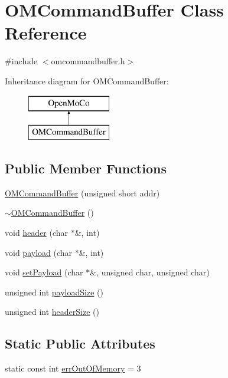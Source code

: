 \hypertarget{class_o_m_command_buffer}{
\section{OMCommandBuffer Class Reference}
\label{class_o_m_command_buffer}
}


{\ttfamily \#include $<$omcommandbuffer.h$>$}

Inheritance diagram for OMCommandBuffer:\begin{figure}[H]
\begin{center}
\leavevmode
\includegraphics[height=2.000000cm]{class_o_m_command_buffer}
\end{center}
\end{figure}
\subsection*{Public Member Functions}
\begin{DoxyCompactItemize}
\item 
\hyperlink{class_o_m_command_buffer_a79bb2396d82d2eb00e8222504698189c}{OMCommandBuffer} (unsigned short addr)
\item 
\hyperlink{class_o_m_command_buffer_ae6a82bcdee2c8afe0354097313dac6f8}{$\sim$OMCommandBuffer} ()
\item 
void \hyperlink{class_o_m_command_buffer_ab23214e0ad79d0184ca105763ea165d8}{header} (char $\ast$\&, int)
\item 
void \hyperlink{class_o_m_command_buffer_a34a300d33ad70285bf490d458abb3e74}{payload} (char $\ast$\&, int)
\item 
void \hyperlink{class_o_m_command_buffer_a955f090dfece6ceef9414dce78f31d81}{setPayload} (char $\ast$\&, unsigned char, unsigned char)
\item 
unsigned int \hyperlink{class_o_m_command_buffer_a195611894a04bedb7b4637281c3e9346}{payloadSize} ()
\item 
unsigned int \hyperlink{class_o_m_command_buffer_aa30260f093bb3a5d2aa9ffe5617f1503}{headerSize} ()
\end{DoxyCompactItemize}
\subsection*{Static Public Attributes}
\begin{DoxyCompactItemize}
\item 
static const int \hyperlink{class_o_m_command_buffer_a529b47966a6c91743ea5e4f1d584b1f2}{errOutOfMemory} = 3
\end{DoxyCompactItemize}


